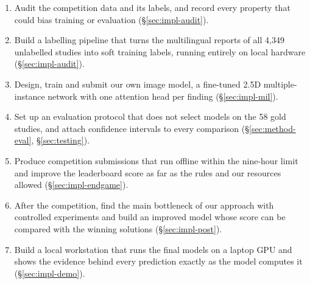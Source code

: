 \begin{enumerate}[label=\textbf{O\arabic*.}, leftmargin=2.6em]
\item Audit the competition data and its labels, and record every property that could bias training or evaluation (\S\ref{sec:impl-audit}).
\item Build a labelling pipeline that turns the multilingual reports of all 4,349 unlabelled studies into soft training labels, running entirely on local hardware (\S\ref{sec:impl-audit}).
\item Design, train and submit our own image model, a fine-tuned 2.5D multiple-instance network with one attention head per finding (\S\ref{sec:impl-mil}).
\item Set up an evaluation protocol that does not select models on the 58 gold studies, and attach confidence intervals to every comparison (\S\ref{sec:method-eval}, \S\ref{sec:testing}).
\item Produce competition submissions that run offline within the nine-hour limit and improve the leaderboard score as far as the rules and our resources allowed (\S\ref{sec:impl-endgame}).
\item After the competition, find the main bottleneck of our approach with controlled experiments and build an improved model whose score can be compared with the winning solutions (\S\ref{sec:impl-post}).
\item Build a local workstation that runs the final models on a laptop GPU and shows the evidence behind every prediction exactly as the model computes it (\S\ref{sec:impl-demo}).
\end{enumerate}
